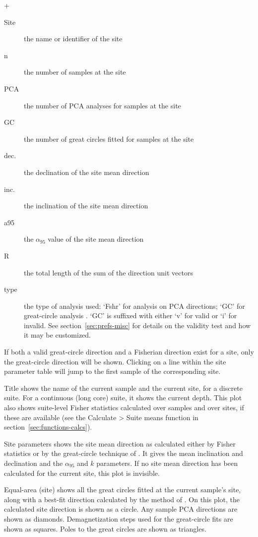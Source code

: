 \documentclass[a4paper,british]{article}
\newcommand{\menuitemlabel}[1]{%
\mbox{\textsf{#1}}\hfil}
\newenvironment{menuitemlist}%
{\begin{list}{}{%
\renewcommand{\makelabel}{\menuitemlabel}%
\setlength{\labelwidth}{35pt}%
\setlength{\leftmargin}%
             {\labelwidth+\labelsep}}}%
{\end{list}}
\newcommand{\ppcmd}[1]{\textsf{#1}} %
\newcommand{\caps}[1]{\MakeTextUppercase{#1}} %
\newcommand{\submenu}{ \textgreater{} } %
\newcommand{\alnifi}{$\alpha_{95}$}
\begin{document}
\begin{menuitemlist}
  \begin{description}
  \item[Site] the name or identifier of the site
  \item[n] the number of samples at the site
  \item[\caps{pca}] the number of \caps{pca} analyses for samples at the site
  \item[GC] the number of great circles fitted for samples at the site
  \item[dec.] the declination of the site mean direction
  \item[inc.] the inclination of the site mean direction
  \item[a95] the \alnifi{} value of the site mean direction
  \item[R] the total length of the sum of the direction unit vectors
  \item[type] the type of analysis used: `Fshr' for \cite{fisher1953sphere}
    analysis on \caps{pca} directions; `GC' for great-circle analysis
    \citep{mcfadden1988circles}. `GC' is suffixed with either `v' for valid
    or `i' for invalid. See section~\ref{sec:prefs-misc} for details on the
    validity test and how it may be customized.
  \end{description}

  If both a valid great-circle direction and a Fisherian direction exist
  for a site, only the great-circle direction will be shown. Clicking on
  a line within the site parameter table will jump to the first sample
  of the corresponding site.

\item[Title] shows the name of the current sample and the current site,
  for a discrete suite. For a continuous (long core) suite, it shows the
  current depth. This plot also shows suite-level Fisher statistics
  calculated over samples and over sites, if these are available (see
  the \ppcmd{Calculate\submenu Suite means} function in
  section~\ref{sec:functions-calcs}).

\item[Site parameters] shows the site mean direction as calculated either by
  Fisher statistics or by the great-circle technique of
  \cite{mcfadden1988circles}. It gives the mean inclination and declination
  and the \alnifi{} and $k$ parameters. If no site mean direction has been
  calculated for the current site, this plot is invisible.

\item[Equal-area (site)] shows all the great circles fitted at the current
  sample's site, along with a best-fit direction calculated by the method of
  \cite{mcfadden1988circles}. On this plot, the calculated site direction is
  shown as a circle. Any sample PCA directions are shown as diamonds.
  Demagnetization steps used for the great-circle fits are shown as squares.
  Poles to the great circles are shown as triangles.


\end{menuitemlist}
\end{document}
